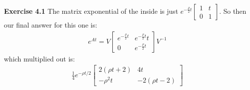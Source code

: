 \documentclass[12pt]{article}
\newenvironment{exercise}[1]{\vspace{.1in}\noindent\textbf{Exercise #1 \hspace{.05em}}}{}
\theoremstyle{definition}
\theoremstyle{remark}
\begin{document}
\begin{exercise}{4.1}
	The matrix exponential of the inside is just $e^{-\frac{\rho}{2}t}%
		\begin{bmatrix}
			1 & t \\
			0 & 1
		\end{bmatrix}$. So then our final answer for this one is:
	\begin{align}
		e^{At}=V %
		\begin{bmatrix}
			e^{-\frac{\rho}{2} t} & e^{-\frac{\rho}{2} t} t \\
			0                     & e^{-\frac{\rho}{2} t}
		\end{bmatrix}V^{-1}
	\end{align}
	which multiplied out is:
	\begin{align}
		\frac{1}{4}e^{-\rho t/2}\begin{bmatrix}
			                        2(\rho t+2) & 4 t          \\
			                        -\rho^2 t   & -2(\rho t-2)
		                        \end{bmatrix}
	\end{align}
\end{exercise}
\end{document}
